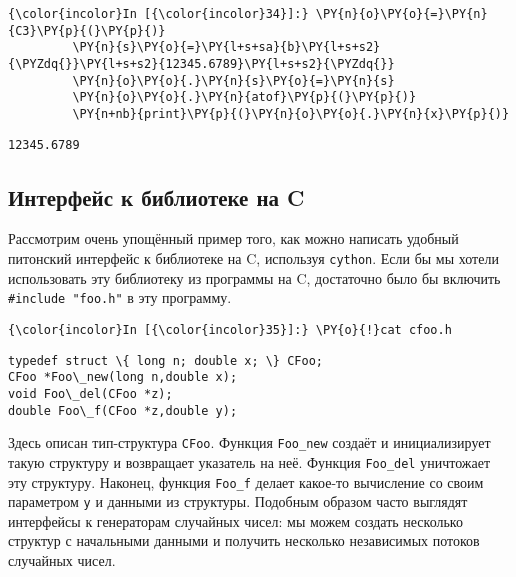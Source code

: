     \begin{Verbatim}[commandchars=\\\{\}]
{\color{incolor}In [{\color{incolor}34}]:} \PY{n}{o}\PY{o}{=}\PY{n}{C3}\PY{p}{(}\PY{p}{)}
         \PY{n}{s}\PY{o}{=}\PY{l+s+sa}{b}\PY{l+s+s2}{\PYZdq{}}\PY{l+s+s2}{12345.6789}\PY{l+s+s2}{\PYZdq{}}
         \PY{n}{o}\PY{o}{.}\PY{n}{s}\PY{o}{=}\PY{n}{s}
         \PY{n}{o}\PY{o}{.}\PY{n}{atof}\PY{p}{(}\PY{p}{)}
         \PY{n+nb}{print}\PY{p}{(}\PY{n}{o}\PY{o}{.}\PY{n}{x}\PY{p}{)}
\end{Verbatim}

    \begin{Verbatim}[commandchars=\\\{\}]
12345.6789

    \end{Verbatim}

\subsection{Интерфейс к библиотеке на C}
\label{cython6}

Рассмотрим очень упощённый пример того, как можно написать удобный
питонский интерфейс к библиотеке на C, используя \texttt{cython}. Если
бы мы хотели использовать эту библиотеку из программы на C, достаточно
было бы включить \texttt{\#include\ "foo.h"} в эту программу.

    \begin{Verbatim}[commandchars=\\\{\}]
{\color{incolor}In [{\color{incolor}35}]:} \PY{o}{!}cat cfoo.h
\end{Verbatim}

    \begin{Verbatim}[commandchars=\\\{\}]
typedef struct \{ long n; double x; \} CFoo;
CFoo *Foo\_new(long n,double x);
void Foo\_del(CFoo *z);
double Foo\_f(CFoo *z,double y);

    \end{Verbatim}

    Здесь описан тип-структура \texttt{CFoo}. Функция \texttt{Foo\_new}
создаёт и инициализирует такую структуру и возвращает указатель на неё.
Функция \texttt{Foo\_del} уничтожает эту структуру. Наконец, функция
\texttt{Foo\_f} делает какое-то вычисление со своим параметром
\texttt{y} и данными из структуры. Подобным образом часто выглядят
интерфейсы к генераторам случайных чисел: мы можем создать несколько
структур с начальными данными и получить несколько независимых потоков
случайных чисел.

